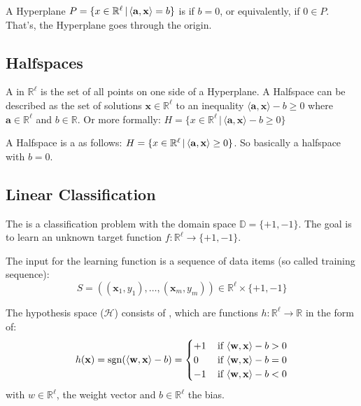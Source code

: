 A Hyperplane $P = \{x \in \mathbb{R}^\ell\,|\, \langle\mathbf{a}, \mathbf{x}\rangle = b\}$ is  if $b = 0$, or equivalently, if $0 \in P$. That's, the Hyperplane goes through the origin.
\subsection{Halfspaces}
A  in $\mathbb{R}^{\ell}$ is the set of all points on one side of a Hyperplane. A Halfspace can be described as the set of solutions $\mathbf{x} \in \mathbb{R}^\ell$ to an inequality $\langle\mathbf{a}, \mathbf{x}\rangle - b \geq 0$ where $\mathbf{a} \in \mathbb{R}^\ell$ and $b \in \mathbb{R}$. Or more formally: $H = \{x \in \mathbb{R}^\ell \, | \, \langle\mathbf{a}, \mathbf{x}\rangle - b \geq 0\}$

A Halfspace is a  as follows: $H = \{x \in \mathbb{R}^\ell \, | \, \langle\mathbf{a}, \mathbf{x}\rangle \geq 0\}$. So basically a halfspace with $b = 0$.

\subsection{Linear Classification}
The  is a classification problem with the domain space $\mathbb{D} = \{+1,-1\}$. The goal is to learn an unknown target function $f:\mathbb{R}^\ell \rightarrow \{+1,-1\}$.

The input for the learning function is a sequence of data items (so called training sequence):
\begin{equation}
S=((\mathbf{x}_{1}, y_{1}), \ldots,(\mathbf{x}_{m}, y_{m})) \in \mathbb{R}^{\ell} \times\{+1,-1\}
\end{equation}

The hypothesis space ($\mathcal{H}$) consists of , which are functions $h:\mathbb{R}^\ell \rightarrow \mathbb{R}$ in the form of:
\begin{equation} 
h(\mathbf{x})=\operatorname{sgn}(\langle\mathbf{w}, \mathbf{x}\rangle- b)=
\begin{cases}
+1 & \, \text {if }\langle\mathbf{w}, \mathbf{x}\rangle - b>0 \\
0 & \,\text {if }\langle\mathbf{w}, \mathbf{x}\rangle - b=0 \\
-1 & \,\text {if }\langle\mathbf{w}, \mathbf{x}\rangle - b<0
\end{cases}
\end{equation}
with $w \in \mathbb{R}^\ell$, the weight vector and $b\in \mathbb{R}^\ell$ the bias.

